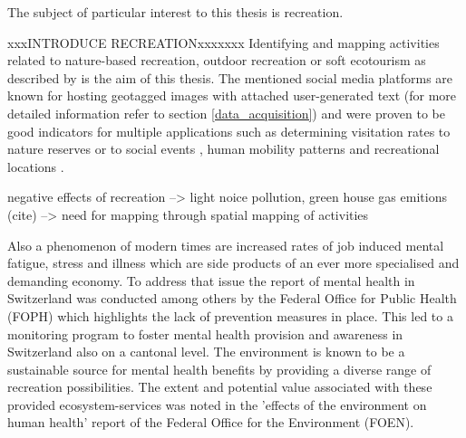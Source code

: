 The subject of particular interest to this thesis is recreation. 

xxxINTRODUCE RECREATIONxxxxxxx
Identifying and mapping activities related to nature-based recreation, outdoor recreation or soft ecotourism as described by \textcite{Deng2002, Balmford2009} is the aim of this thesis.
The mentioned social media platforms are known for hosting geotagged images with attached user-generated text (for more detailed information refer to section \ref{data_acquisition}) and were proven to be good indicators for multiple applications such as determining visitation rates to nature reserves \parencite{Tenkanen2017, Heikinheimo2017, Keeler2015, Wood2013} or to social events \parencite{Pettersson2011}, human mobility patterns \parencite{Barchiesi2015, Grossenbacher2014} and recreational locations \parencite{Weyland2014, Hill2006, Neuvonen2010}.


negative effects of recreation --> light noice pollution, green house gas emitions (cite) --> need for mapping through spatial mapping of activities


Also a phenomenon of modern times are increased rates of job induced mental fatigue, stress and illness which are side products of an ever more specialised and demanding economy. To address that issue the report of mental health in Switzerland \parencite{Ruesch2003} was conducted among others by the Federal Office for Public Health (FOPH) which highlights the lack of prevention measures in place. This led to a monitoring program to foster mental health provision and awareness in Switzerland \parencite{Schuler2012} also on a cantonal level. The environment is known to be a sustainable source for mental health benefits by providing a diverse range of recreation possibilities. The extent and potential value associated with these provided ecosystem-services was noted in the 'effects of the environment on human health' report \parencite{Ragettli2017} of the Federal Office for the Environment (FOEN). \\

